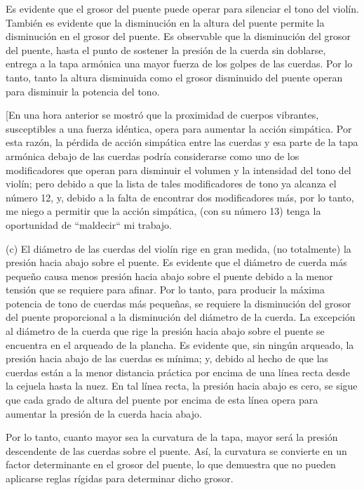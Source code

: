 \documentclass[12pt]{book}
\begin{document}
Es evidente que el grosor del puente puede operar para silenciar el tono del violín. También es evidente que la disminución en la altura del puente permite la disminución en el grosor del puente. Es observable que la disminución del grosor del puente, hasta el punto de sostener la presión de la cuerda sin doblarse, entrega a la tapa armónica una mayor fuerza de los golpes de las cuerdas. Por lo tanto, tanto la altura disminuida como el grosor disminuido del puente operan para disminuir la potencia del tono.

[En una hora anterior se mostró que la proximidad de cuerpos vibrantes, susceptibles a una fuerza idéntica, opera para aumentar la acción simpática. Por esta razón, la pérdida de acción simpática entre las cuerdas y esa parte de la tapa armónica debajo de las cuerdas podría considerarse como uno de los modificadores que operan para disminuir el volumen y la intensidad del tono del violín; pero debido a que la lista de tales modificadores de tono ya alcanza el número 12, y, debido a la falta de encontrar dos modificadores más, por lo tanto, me niego a permitir que la acción simpática, (con su número 13) tenga la oportunidad de ``maldecir`` mi trabajo.

(c) El diámetro de las cuerdas del violín rige en gran medida, (no totalmente) la presión hacia abajo sobre el puente. Es evidente que el diámetro de cuerda más pequeño causa menos presión hacia abajo sobre el puente debido a la menor tensión que se requiere para afinar. Por lo tanto, para producir la máxima potencia de tono de cuerdas más pequeñas, se requiere la disminución del grosor del puente proporcional a la disminución del diámetro de la cuerda. La excepción al diámetro de la cuerda que rige la presión hacia abajo sobre el puente se encuentra en el arqueado de la plancha. Es evidente que, sin ningún arqueado, la presión hacia abajo de las cuerdas es mínima; y, debido al hecho de que las cuerdas están a la menor distancia práctica por encima de una línea recta desde la cejuela hasta la nuez. En tal línea recta, la presión hacia abajo es cero, se sigue que cada grado de altura del puente por encima de esta línea opera para aumentar la presión de la cuerda hacia abajo.


Por lo tanto, cuanto mayor sea la curvatura de la tapa, mayor será la presión descendente de las cuerdas sobre el puente. Así, la curvatura se convierte en un factor determinante en el grosor del puente, lo que demuestra que no pueden aplicarse reglas rígidas para determinar dicho grosor.
\end{document}
